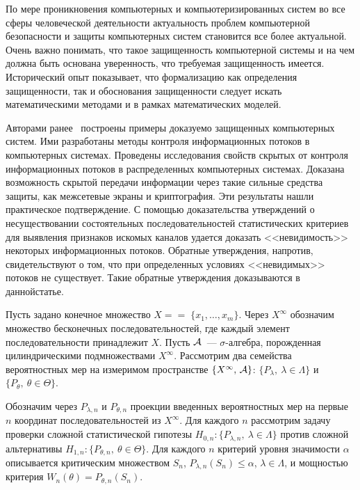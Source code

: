       \thispagestyle{headings}

      \begin{multicols}{2}

      \label{st\stat}

    По мере проникновения компьютерных и компьютеризированных систем 
во все сферы человеческой деятельности актуальность проблем компьютерной 
безопасности и защиты компьютерных систем становится все более 
актуальной. Очень важно понимать, что такое защищенность компьютерной 
системы и на чем должна быть основана уверенность, что требуемая 
защищенность имеется. Исторический опыт показывает, что формализацию как 
определения защищенности, так и обоснования защищенности следует искать 
математическими методами и в рамках математических моделей.
    
    Авторами ранее~\cite{5gr, 6gr} построены примеры доказуемо 
защищенных компьютерных систем. Ими разработаны методы контроля 
информационных потоков в компьютерных системах. Проведены исследования 
свойств скрытых от контроля информационных потоков в распределенных 
компьютерных системах. Доказана возможность скрытой передачи 
информации через такие сильные средства защиты, как межсетевые экраны и 
криптография. Эти результаты нашли практическое подтверждение. С 
помощью доказательства утверждений о несуществовании состоятельных 
последовательностей статистических критериев~\cite{1gr, 2gr} для выяв\-ления 
признаков искомых каналов удается дока\-зать <<невидимость>> некоторых 
информационных по\-токов. Обратные утверждения, напротив, свидетельствуют 
о том, что при определенных условиях <<невидимых>> потоков не существует. 
Такие обратные утверждения доказываются в данной\linebreak статье.
    

    Пусть задано конечное множество  $X =$\linebreak $=\;\{x_1,\ldots,x_m\}$. Через 
$X^\infty$ обозначим множество бесконечных последовательностей, где 
каж\-дый элемент последовательности принадлежит $X$. Пусть $\cal{A}$~--- 
$\sigma$-алгебра, порожденная цилиндрическими подмножествами $X^\infty$. 
Рассмотрим два семейства вероятностных мер на измеримом пространстве 
$\{X^\infty,\,\cal{A}\}$:
    $\{P_\lambda ,\ \lambda\in \Lambda\}$ и $\{P_\theta , \ \theta\in \Theta\}$.


    Обозначим через $P_{\lambda,n}$ и $P_{\theta,n}$ проекции введенных 
вероятностных мер на первые $n$ координат последовательностей из 
$X^\infty$. Для  каждого $n$ рассмотрим задачу проверки сложной 
статистической гипотезы $H_{0,n}:  \{P_{\lambda,n}, \ \lambda\in \Lambda\}$ 
против сложной альтернативы $H_{1,n}: \{P_{\theta,n},\ \theta\in\Theta\}$.  Для 
каждого $n$ критерий уровня значимости $\alpha$ описывается критическим 
множеством $S_n$, $P_{\lambda,n}(S_n)\leq \alpha$, $\lambda\in\Lambda$, и 
мощностью критерия $W_n(\theta ) =P_{\theta, n}(S_n)$.
    

\end{multicols}

